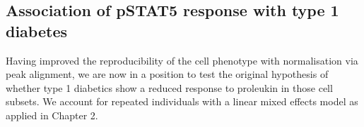 
\subsection{Association of pSTAT5 response with type 1 diabetes}

Having improved the reproducibility of the cell phenotype with normalisation via peak alignment, we are now in a position to test
the original hypothesis of whether type 1 diabetics show a reduced response to proleukin in those cell subsets.
We account for repeated individuals with a linear mixed effects model as applied in Chapter 2.%

